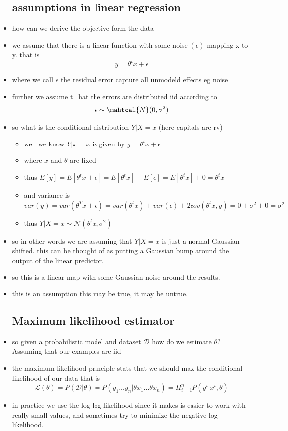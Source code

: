 \documentclass{article}
\begin{document}
\begin{itemize}
 \subsection{assumptions in linear regression}
\item how can we derive the objective form the data 
\item we assume that there is a linear function with some noise $(\epsilon)$ mapping x to y. that is $$y=\theta^tx+\epsilon$$
\item where we call $\epsilon$ the residual error capture all unmodeld effects eg noise
\item further we assume t=hat the errors are distributed iid according to $$\epsilon\sim \mahtcal{N}(0,\sigma^2)$$
 \item so what is the conditional distribution  $Y|X=x$ (here capitals are rv)
 \begin{itemize}
     \item well we know $Y|x=x$ is given by $y=\theta^tx+\epsilon$
     \item where $x$ and $\theta$ are fixed 
     \item thus $E[y]=E[\theta^tx+\epsilon]=E[\theta^tx]+E[\epsilon]=E[\theta^tx]+0=\theta^tx$
     \item and variance is $var(y)=var(\theta^Tx+\epsilon)=var(\theta^tx)+var(\epsilon)+2cov(\theta^tx,y)=0+\sigma^2+0=\sigma^2$
     \item thus $Y|X=x\sim \mathcal{N}(\theta^tx,\sigma^2)$
 \end{itemize}
 \item so in other words we are assuming that $Y|X=x$ is just a normal Gaussian shifted. this can be thought of as putting a Gaussian bump around the output of the linear predictor. 
 \item so this is a linear map with some Gaussian noise around the results. 
 \item this is an assumption this may be true, it may be untrue. 
 \subsection{Maximum likelihood estimator}
 \item so given a probabilistic model and dataset $\mathcal{D}$ how do we estimate $\theta$? Assuming that our examples are iid
 \item the maximum likelihood principle stats that we should max the conditional likelihood of our data that is $$\mathcal{L}(\theta)=P(\mathcal{D}|\theta)=P(y_1...y_n|\theta x_1...\theta x_n)=\Pi_{i=1}^{n}P(y^i|x^i,\theta)$$
 \item in practice we use the log log likelihood since it makes is easier to work with really small values, and sometimes try to minimize the negative log likelihood. 

\end{itemize}
\end{document}
